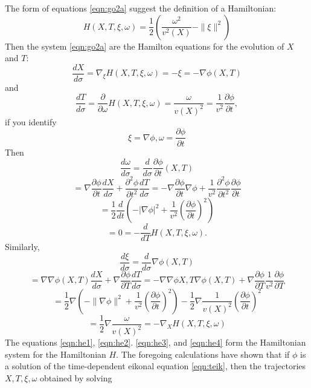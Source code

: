 The form of equations \ref{eqn:go2a} suggest the definition of a Hamiltonian:
\[
H(X,T,\xi,\omega) = \frac{1}{2}\left(\frac{\omega^2}{v^2(X)} - \|\xi\|^2\right)
\]
Then the system \ref{eqn:go2a} are the Hamilton equations for the evolution of $X$ and $T$:
\begin{equation}
\label{eqn:he1}
\frac{dX}{d\sigma} = \nabla_{\xi}H(X,T,\xi,\omega) = -\xi=-\nabla \phi(X,T)
\end{equation}
and 
\begin{equation}
\label{eqn:he2}
\frac{dT}{d\sigma} = \frac{\partial}{\partial \omega} H(X,T,\xi,\omega) = \frac{\omega}{v(X)^2} = \frac{1}{v^2}\frac{\partial \phi}{\partial t},
\end{equation}
 if you identify
\begin{equation}
\label{eqn:xiomega}
\xi = \nabla \phi, \omega = \frac{\partial \phi}{\partial t}
\end{equation}
Then
\[
\frac{d\omega}{d\sigma} = \frac{d}{d\sigma} \frac{\partial \phi}{\partial t}(X,T) 
\]
\[
= \nabla\frac{\partial \phi}{\partial t}\frac{dX}{d\sigma} + \frac{\partial^2 \phi}{\partial t^2}\frac{dT}{d\sigma}
= -\nabla\frac{\partial \phi}{\partial t}\nabla\phi + 
\frac{1}{v^2}\frac{\partial^2 \phi}{\partial t^2}\frac{\partial \phi}{\partial t}
\]
\[
=\frac{1}{2}\frac{d}{dt} \left(-|\nabla \phi|^2+\frac{1}{v^2}\left(\frac{\partial \phi}{\partial t}\right)^2\right)
\]
\begin{equation}
\label{eqn:he4}
= 0 = -\frac{d}{dT}H(X,T,\xi,\omega).
\end{equation}
Similarly,
\[
\frac{d\xi}{d\sigma} = \frac{d}{d\sigma} \nabla \phi(X,T)
\]
\[
=\nabla \nabla \phi(X,T)\frac{dX}{d\sigma} + \nabla \frac{\partial \phi}{\partial T} \frac{dT}{d\sigma}
= -\nabla\nabla \phi{X,T}\nabla \phi(X,T) + \nabla \frac{\partial \phi}{\partial T} \frac{1}{v^2}\frac{\partial \phi}{\partial T}
\]
\[
=\frac{1}{2}\nabla\left(-\|\nabla \phi\|^2 + \frac{1}{v^2}\left(\frac{\partial \phi}{\partial t}\right)^2\right)
-\frac{1}{2}\nabla\frac{1}{v(X)^2} \left(\frac{\partial \phi}{\partial t}\right)^2
\]
\begin{equation}
\label{eqn:he3}
= \frac{1}{2}\nabla\frac{\omega}{v(X)^2} = -\nabla_X H(X,T,\xi,\omega)
\end{equation}
The equations \ref{eqn:he1}, \ref{eqn:he2}. \ref{eqn:he3}, and \ref{eqn:he4} form the Hamiltonian system for the Hamiltonian $H$. The foregoing calculations have shown that if $\phi$ is a solution of the time-dependent eikonal equation \ref{eqn:teik}, then the trajectories $X,T,\xi,\omega$ obtained by solving 
